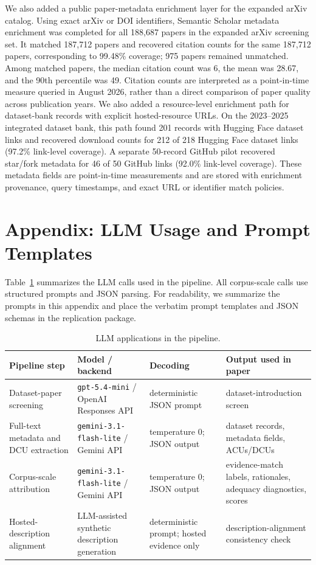\documentclass[11pt]{article}
\begin{document}
We also added a public paper-metadata enrichment layer for the expanded arXiv catalog.
Using exact arXiv or DOI identifiers, Semantic Scholar metadata enrichment was completed for all 188,687 papers in the expanded arXiv screening set.
It matched 187,712 papers and recovered citation counts for the same 187,712 papers, corresponding to 99.48\% coverage; 975 papers remained unmatched.
Among matched papers, the median citation count was 6, the mean was 28.67, and the 90th percentile was 49.
Citation counts are interpreted as a point-in-time measure queried in August 2026, rather than a direct comparison of paper quality across publication years.
We also added a resource-level enrichment path for dataset-bank records with explicit hosted-resource URLs.
On the 2023--2025 integrated dataset bank, this path found 201 records with Hugging Face dataset links and recovered download counts for 212 of 218 Hugging Face dataset links (97.2\% link-level coverage).
A separate 50-record GitHub pilot recovered star/fork metadata for 46 of 50 GitHub links (92.0\% link-level coverage).
These metadata fields are point-in-time measurements and are stored with enrichment provenance, query timestamps, and exact URL or identifier match policies.

\section{Appendix: LLM Usage and Prompt Templates}
\label{app:llm_usage}

Table~\ref{tab:llm_usage} summarizes the LLM calls used in the pipeline.
All corpus-scale calls use structured prompts and JSON parsing.
For readability, we summarize the prompts in this appendix and place the verbatim prompt templates and JSON schemas in the replication package.
\begin{table}[h]
\centering
\scriptsize
\setlength{\tabcolsep}{4pt}
\begin{tabular}{p{.24\linewidth}p{.24\linewidth}p{.22\linewidth}p{.20\linewidth}}
\toprule
Pipeline step & Model / backend & Decoding & Output used in paper \\
\midrule
Dataset-paper screening & \texttt{gpt-5.4-mini} / OpenAI Responses API & deterministic JSON prompt & dataset-introduction screen \\
Full-text metadata and DCU extraction & \texttt{gemini-3.1-flash-lite} / Gemini API & temperature 0; JSON output & dataset records, metadata fields, ACUs/DCUs \\
Corpus-scale attribution & \texttt{gemini-3.1-flash-lite} / Gemini API & temperature 0; JSON output & evidence-match labels, rationales, adequacy diagnostics, scores \\
Hosted-description alignment & LLM-assisted synthetic description generation & deterministic prompt; hosted evidence only & description-alignment consistency check \\
\bottomrule
\end{tabular}
\caption{LLM applications in the pipeline.}
\label{tab:llm_usage}
\end{table}
\end{document}
